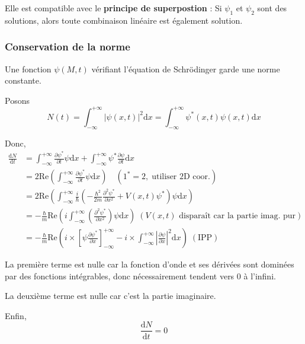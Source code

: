 Elle est compatible avec le \textbf{principe de superpostion} : Si $\psi_1$ et $\psi_2$ sont des solutions, alors toute combinaison linéaire est également solution.

\subsubsection{Conservation de la norme} %
\label{sub:Conservation de la norme}

\begin{Theorem}{}{}
Une fonction $\psi(M,t)$ vérifiant l'équation de Schrödinger garde une norme constante.
\end{Theorem}

\begin{myproof}{}{}
  Posons 
  \begin{equation}
    N(t) = \int_{- \infty}^{+ \infty} | \psi(x,t) | ^{2} \mathrm{d} x = \int_{- \infty}^{ + \infty} \psi ^{*}(x,t) \psi(x,t)\mathrm{d}x
  \end{equation}

  Donc, 
  \begin{align}
    \frac{\mathrm{d}N}{\mathrm{d}t} &= \int_{- \infty}^{+ \infty} \frac{\partial \psi ^{*}}{\partial t} \psi \mathrm{d} x + \int_{- \infty}^{+ \infty} \psi ^{*} \frac{\partial \psi}{\partial t} \mathrm{d}x \\ 
                                    &= 2 \mathrm{Re}\left( \int_{- \infty}^{+ \infty} \frac{\partial  \psi ^{*}}{\partial t} \psi \mathrm{d}x \right) \quad (1 ^{*} = 2,\; \text{utiliser 2D coor.})
                                \\ &= 2 \mathrm{Re} \left( \int_{- \infty}^{+ \infty} \frac{
                                        i
                                    }{\hbar} \left( - \frac{\hbar ^{2}}{2m} \frac{\partial ^{2} \psi ^{*}}{\partial x ^{2}} + V(x,t) \psi ^{*} \right) \psi \mathrm{d}x \right) \\ 
                                    &= - \frac{\hbar}{m} \mathrm{Re} \left( i \int_{- \infty}^{+ \infty} \left( \frac{\partial ^{2}\psi ^{*}}{\partial x ^{2}}  \right) \psi \mathrm{d}x \right)\; (V(x,t) \text{ disparaît car la partie imag. pur}) \\ 
                                    &=  - \frac{\hbar}{m} \mathrm{Re} \left( i \times \left[ \psi \frac{\partial \psi ^{*}}{\partial x}  \right]_{- \infty} ^{+ \infty} - i \times \int_{- \infty}^{+ \infty} | \frac{\partial \psi}{\partial x} | ^{2}\mathrm{d}x \right) \;(\text{IPP})
  \end{align}

  La première terme est nulle car la fonction d'onde et ses dérivées sont dominées par des fonctions intégrables, donc nécessairement tendent vers 0 à l'infini.

  La deuxième terme est nulle car c'est la partie imaginaire. 

  Enfin, 
  \begin{equation}
    \frac{\mathrm{d}N}{\mathrm{d}t}  = 0
  \end{equation}
\end{myproof}



